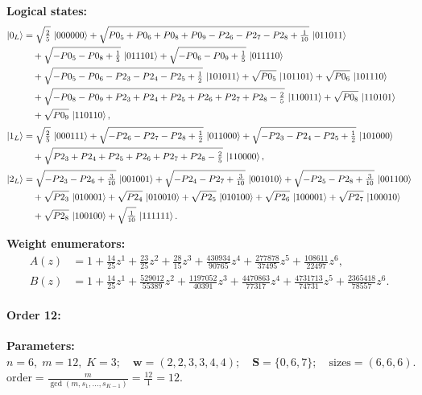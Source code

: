 \documentclass[11pt]{article}
\begin{document}
\noindent\textbf{Logical states:}
\begin{align*}
\ket{0_L} &= \sqrt{\tfrac{2}{5}}\,\ket{000000} + \sqrt{P0_5 + P0_6 + P0_8 + P0_9 - P2_6 - P2_7 - P2_8 + \tfrac{1}{10}}\,\ket{011011}\\
&\quad + \sqrt{-P0_5 - P0_8 + \tfrac{1}{5}}\,\ket{011101} + \sqrt{-P0_6 - P0_9 + \tfrac{1}{5}}\,\ket{011110}\\
&\quad + \sqrt{-P0_5 - P0_6 - P2_3 - P2_4 - P2_5 + \tfrac{1}{2}}\,\ket{101011} + \sqrt{P0_5}\,\ket{101101} + \sqrt{P0_6}\,\ket{101110}\\
&\quad + \sqrt{-P0_8 - P0_9 + P2_3 + P2_4 + P2_5 + P2_6 + P2_7 + P2_8 - \tfrac{2}{5}}\,\ket{110011} + \sqrt{P0_8}\,\ket{110101}\\
&\quad + \sqrt{P0_9}\,\ket{110110},
\\[2pt]
\ket{1_L} &= \sqrt{\tfrac{2}{5}}\,\ket{000111} + \sqrt{-P2_6 - P2_7 - P2_8 + \tfrac{1}{2}}\,\ket{011000} + \sqrt{-P2_3 - P2_4 - P2_5 + \tfrac{1}{2}}\,\ket{101000}\\
&\quad + \sqrt{P2_3 + P2_4 + P2_5 + P2_6 + P2_7 + P2_8 - \tfrac{2}{5}}\,\ket{110000},
\\[2pt]
\ket{2_L} &= \sqrt{-P2_3 - P2_6 + \tfrac{3}{10}}\,\ket{001001} + \sqrt{-P2_4 - P2_7 + \tfrac{3}{10}}\,\ket{001010} + \sqrt{-P2_5 - P2_8 + \tfrac{3}{10}}\,\ket{001100}\\
&\quad + \sqrt{P2_3}\,\ket{010001} + \sqrt{P2_4}\,\ket{010010} + \sqrt{P2_5}\,\ket{010100} + \sqrt{P2_6}\,\ket{100001} + \sqrt{P2_7}\,\ket{100010}\\
&\quad + \sqrt{P2_8}\,\ket{100100} + \sqrt{\tfrac{1}{10}}\,\ket{111111}.
\end{align*}

\noindent\textbf{Weight enumerators:}
\begin{align*}
A(z) &= 1 + \tfrac{14}{25}z^{1} + \tfrac{23}{25}z^{2} + \tfrac{28}{15}z^{3} + \tfrac{430934}{90765}z^{4} + \tfrac{277878}{37495}z^{5} + \tfrac{108611}{22497}z^{6},\\[2pt]
B(z) &= 1 + \tfrac{14}{25}z^{1} + \tfrac{529012}{55389}z^{2} + \tfrac{1197052}{40391}z^{3} + \tfrac{4470863}{77317}z^{4} + \tfrac{4731713}{74731}z^{5} + \tfrac{2365418}{78557}z^{6}.
\end{align*}

\paragraph{\textbf{Order 12:}}
\noindent\textbf{Parameters:} $n=6,\; m=12,\; K=3;\quad \mathbf w=(2, 2, 3, 3, 4, 4);\quad \mathbf S=\{0, 6, 7\};\quad \text{sizes}=\left(6, 6, 6\right).$ $\displaystyle \text{order}=\frac{m}{\gcd(m,s_1,\dots,s_{K-1})}=\frac{12}{1}=12.$
\end{document}
